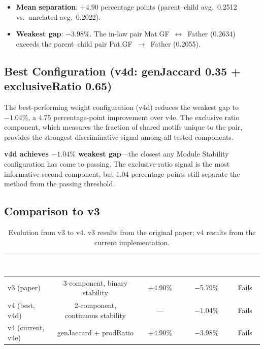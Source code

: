 \documentclass{../yalumba}
\begin{document}
\begin{itemize}
  \item \textbf{Mean separation}: $+4.90$ percentage points (parent--child
    avg.\ 0.2512 vs.\ unrelated avg.\ 0.2022).
  \item \textbf{Weakest gap}: $-3.98\%$.  The in-law pair
    Mat.GF~$\leftrightarrow$~Father (0.2634) exceeds the parent--child pair
    Pat.GF~$\to$~Father (0.2055).
\end{itemize}

\subsection{Best Configuration (v4d: genJaccard 0.35 + exclusiveRatio 0.65)}

The best-performing weight configuration (v4d) reduces the weakest gap to
$-1.04\%$, a $4.75$ percentage-point improvement over v4e.  The exclusive
ratio component, which measures the fraction of shared motifs unique to the
pair, provides the strongest discriminative signal among all tested components.

\begin{keyfinding}
\textbf{v4d achieves $-1.04\%$ weakest gap}---the closest any Module Stability
configuration has come to passing.  The exclusive-ratio signal is the most
informative second component, but 1.04 percentage points still separate the
method from the passing threshold.
\end{keyfinding}

\subsection{Comparison to v3}

\begin{table}[H]
  \centering
  \tablestyle
  \caption{Evolution from v3 to v4.  v3 results from the original paper;
    v4 results from the current implementation.}
  \label{tab:v3-v4}
  \begin{tabular}{lcccc}
    \toprule
    \rowcolor{table-header}
    \textcolor{white}{\textbf{Version}} &
    \textcolor{white}{\textbf{Scoring}} &
    \textcolor{white}{\textbf{Separation}} &
    \textcolor{white}{\textbf{Weakest Gap}} &
    \textcolor{white}{\textbf{Status}} \\
    \midrule
    v3 (paper) & 3-component, binary stability
      & $+$4.90\% & $-$5.79\% & Fails \\
    v4 (best, v4d) & 2-component, continuous stability
      & --- & $-$1.04\% & Fails \\
    v4 (current, v4e) & genJaccard + prodRatio
      & $+$4.90\% & $-$3.98\% & Fails \\
    \bottomrule
  \end{tabular}
\end{table}
\end{document}
